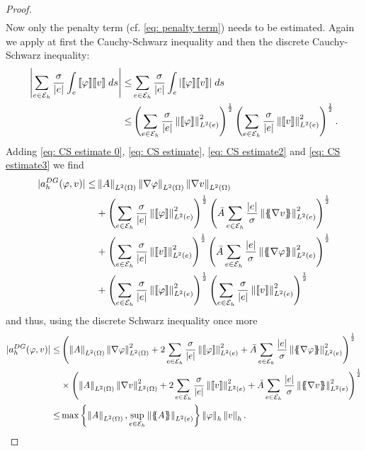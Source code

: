 \begin{proof}
\begin{align}
	\end{align}
	Now only the penalty term (cf. \eqref{eq: penalty term}) needs to be estimated. Again we apply at first the Cauchy-Schwarz inequality and then the discrete Cauchy-Schwarz inequality:
	\begin{align}
	\left| \sum_{e \in \mathcal{E}_h} \frac \sigma {|e|} \int_{e} {{\llbracket \varphi \rrbracket \llbracket v \rrbracket }\;ds} \right|
	\leq& \sum_{e \in \mathcal{E}_h} \frac \sigma  {|e|} \int_{e} {{ \left| \llbracket \varphi \rrbracket \llbracket v \rrbracket  \right|}\;ds} \nonumber \\
	\leq& \left( \sum\limits_{e \in \mathcal{E}_h} \frac \sigma{|e|} \left\lVert \llbracket \varphi \rrbracket \right\rVert_{L^2(e)}^2 \right)^{\frac 1 2} \left( \sum\limits_{e \in \mathcal{E}_h} \frac \sigma {|e|} \left\lVert \llbracket v \rrbracket \right\rVert_{L^2(e)}^2 \right)^{\frac 1 2}. \label{eq: CS estimate3}
	\end{align}
	Adding \eqref{eq: CS estimate 0}, \eqref{eq: CS estimate}, \eqref{eq: CS estimate2} and \eqref{eq: CS estimate3} we find 
	\begin{align}
	|a_h^{DG}(\varphi,v)| \leq& 
	 \LTwonorm{A} \LTwonorm {\nabla \varphi} \LTwonorm{\nabla v} \nonumber\\
	& +\left( \sum\limits_{e \in \edges}\frac {\sigma}{|e|}\LTwonormE{\jump {\varphi}}^2 \right)^{\frac 1 2}
	\left( \bar A \sum\limits_{e \in \edges} \frac {|e|} \sigma \LTwonormE{\average{\nabla v}}^2 \right)^{\frac 1 2} \nonumber\\
	& +	\left( \sum\limits_{e \in \edges} \frac {\sigma} {|e|}\LTwonormE{\jump {v}}^2 \right)^{\frac 1 2}
	\left( \bar A \sum\limits_{e \in \edges} \frac {|e|} \sigma \LTwonormE{\average{\nabla \varphi}}^2 \right)^{\frac 1 2}\nonumber \\
	& + \left( \sum\limits_{e \in \edges} \frac \sigma{|e|} \LTwonormE{\jump{\varphi}}^2 \right)^{\frac 1 2} \left( \sum\limits_{e \in \edges} \frac \sigma {|e|} \LTwonormE{\jump{v}}^2 \right)^{\frac 1 2} \nonumber
	\end{align}
	and thus, using the discrete Schwarz inequality once more
	\begin{align}
		|a_h^{DG}(\varphi,v)|
	\leq& 
	\left( 
	\LTwonorm{A}\LTwonorm{\nabla \varphi}^2+2\sum\limits_{e \in \edges} \frac {\sigma} {|e|}\LTwonormE{\jump {\varphi}}^2+ \bar A\sum\limits_{e \in \edges} \frac {|e|} \sigma \LTwonormE{\average{\nabla \varphi}}^2
	\right)^{\frac 1 2} \nonumber \\
	&\times
	\left( 
	\LTwonorm{A} \LTwonorm{\nabla v}^2+2\sum\limits_{e \in \edges} \frac {\sigma}{|e|}\LTwonormE{\jump {v}}^2+ \bar A\sum\limits_{e \in \edges} \frac {|e|} \sigma \LTwonormE{\average{\nabla v}}^2
	\right) ^{\frac 1 2} \nonumber \\
	\leq & \max {\LTwonorm{A}} {\sup_{e \in \edges }\LTwonormE{\average A}} \eNorm \varphi \eNorm v.   \label{eq: exact estimate boundedness} %
	\end{align}
	\phantom{blub}
\end{proof}

